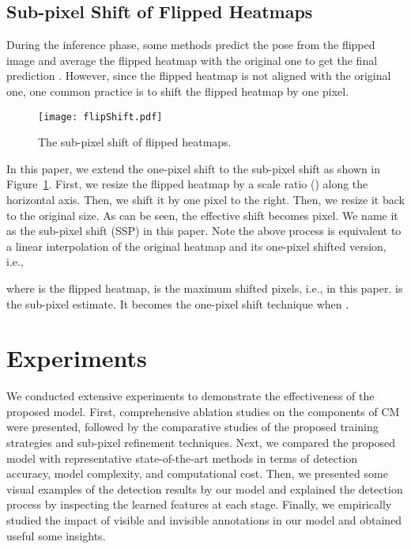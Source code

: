 \documentclass[twocolumn]{svjour3}          \smartqed  \usepackage{natbib}
\begin{document}
\subsection{Sub-pixel Shift of Flipped Heatmaps}
\label{subsec:flipshit}

During the inference phase, some methods predict the pose from the flipped image and average the flipped heatmap with the original one to get the final prediction \citep{chen2018cascaded, xiao2018simple}. However, since the flipped heatmap is not aligned with the original one, one common practice is to shift the flipped heatmap by one pixel.

\begin{figure}[t]
\centering
\texttt{[image: flipShift.pdf]}
\caption{The sub-pixel shift of flipped heatmaps.}
\label{fig:flipShift}
\end{figure}

In this paper, we extend the one-pixel shift to the sub-pixel shift as shown in Figure~\ref{fig:flipShift}. First, we resize the flipped heatmap by a scale ratio  () along the horizontal axis. Then, we shift it by one pixel to the right. Then, we resize it back to the original size. As can be seen, the effective shift becomes  pixel. We name it as the sub-pixel shift (SSP) in this paper. Note the above process is equivalent to a linear interpolation of the original heatmap and its one-pixel shifted version, i.e.,

where  is the flipped heatmap,  is the maximum shifted pixels, i.e.,  in this paper.  is the sub-pixel estimate. It becomes the one-pixel shift technique when .


\section{Experiments}
\label{sec:experiments}
We conducted extensive experiments to demonstrate the effectiveness of the proposed model. First, comprehensive ablation studies on the components of CM were presented, followed by the comparative studies of the proposed training strategies and sub-pixel refinement techniques. Next, we compared the proposed model with representative state-of-the-art methods in terms of detection accuracy, model complexity, and computational cost. Then, we presented some visual examples of the detection results by our model and explained the detection process by inspecting the learned features at each stage. Finally, we empirically studied the impact of visible and invisible annotations in our model and obtained useful some insights. 
\end{document}
